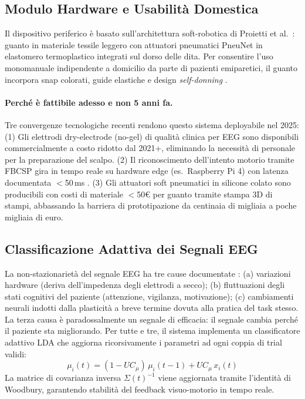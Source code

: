 \documentclass[a4paper,11pt]{article}
\begin{document}
\subsection{Modulo Hardware e Usabilità Domestica}
Il dispositivo periferico è basato sull'architettura soft-robotica di Proietti et al.\
\cite{proietti2024combining}: guanto in materiale tessile leggero con attuatori
pneumatici PneuNet in elastomero termoplastico integrati sul dorso delle dita.
Per consentire l'uso monomanuale indipendente a domicilio da parte di pazienti
emiparetici, il guanto incorpora snap colorati, guide elastiche e design
\textit{self-donning} \cite{proietti2024combining, fiska2025integration}.

\paragraph{Perché è fattibile adesso e non 5 anni fa.}
Tre convergenze tecnologiche recenti rendono questo sistema deployabile nel 2025:
(1) Gli elettrodi dry-electrode (no-gel) di qualità clinica per EEG sono disponibili
commercialmente a costo ridotto dal 2021+, eliminando la necessità di personale per
la preparazione del scalpo.
(2) Il riconoscimento dell'intento motorio tramite FBCSP gira in tempo reale su
hardware edge (es.\ Raspberry Pi 4) con latenza documentata $<$50\,ms \cite{wu2024adaptive}.
(3) Gli attuatori soft pneumatici in silicone colato sono producibili con costi di
materiale $<$50€ per guanto tramite stampa 3D di stampi, abbassando la barriera di
prototipazione da centinaia di migliaia a poche migliaia di euro.

\subsection{Classificazione Adattiva dei Segnali EEG}
La non-stazionarietà del segnale EEG ha tre cause documentate \cite{wu2024adaptive}:
(a) variazioni hardware (deriva dell'impedenza degli elettrodi a secco);
(b) fluttuazioni degli stati cognitivi del paziente (attenzione, vigilanza, motivazione);
(c) cambiamenti neurali indotti dalla plasticità a breve termine dovuta alla pratica
del task stesso. La terza causa è paradossalmente un segnale di efficacia: il segnale
cambia perché il paziente sta migliorando. Per tutte e tre, il sistema implementa un
classificatore adattivo LDA \cite{wu2024adaptive} che aggiorna ricorsivamente i
parametri ad ogni coppia di trial validi:
\begin{equation}
\mu_i(t) = (1 - UC_{\mu})\,\mu_i(t-1) + UC_{\mu}\,x_i(t)
\end{equation}
La matrice di covarianza inversa $\Sigma(t)^{-1}$ viene aggiornata tramite l'identità
di Woodbury, garantendo stabilità del feedback visuo-motorio in tempo reale.
\end{document}
